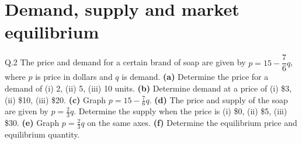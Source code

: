 \section{Demand, supply and market equilibrium}

\begin{question}{Q.2}
The price and demand for a certain brand of soap are given by
$p=15-\dfrac{7}{6}q$, where $p$ is price in dollars and $q$ is demand.
\textbf{(a)} Determine the price for a demand of (i) 2, (ii) 5, (iii) 10 units.
\textbf{(b)} Determine demand at a price of (i) \$3, (ii) \$10, (iii) \$20.
\textbf{(c)} Graph $p=15-\tfrac76 q$.
\textbf{(d)} The price and supply of the soap are given by $p=\tfrac23 q$.
Determine the supply when the price is (i) \$0, (ii) \$5, (iii) \$30.
\textbf{(e)} Graph $p=\tfrac23 q$ on the same axes.
\textbf{(f)} Determine the equilibrium price and equilibrium quantity.
\end{question}

